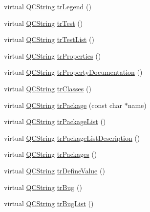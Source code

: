\begin{DoxyCompactItemize}
\item 
virtual \hyperlink{class_q_c_string}{Q\+C\+String} \hyperlink{class_translator_chinesetraditional_a7ec3338207371dd6b06edfe7a212d443}{tr\+Legend} ()
\item 
virtual \hyperlink{class_q_c_string}{Q\+C\+String} \hyperlink{class_translator_chinesetraditional_a986fde8083b58bef975adf8b94e40718}{tr\+Test} ()
\item 
virtual \hyperlink{class_q_c_string}{Q\+C\+String} \hyperlink{class_translator_chinesetraditional_a08c527aab589d7798710e841c0d79294}{tr\+Test\+List} ()
\item 
virtual \hyperlink{class_q_c_string}{Q\+C\+String} \hyperlink{class_translator_chinesetraditional_a12d4ce73f80d761d88d4f48502d1deb4}{tr\+Properties} ()
\item 
virtual \hyperlink{class_q_c_string}{Q\+C\+String} \hyperlink{class_translator_chinesetraditional_a957f249ec35e3e55307591caed7094a6}{tr\+Property\+Documentation} ()
\item 
virtual \hyperlink{class_q_c_string}{Q\+C\+String} \hyperlink{class_translator_chinesetraditional_a595c8dfa4f0a38cae32a616baae240f1}{tr\+Classes} ()
\item 
virtual \hyperlink{class_q_c_string}{Q\+C\+String} \hyperlink{class_translator_chinesetraditional_af245c5b503a9b765a2d2eb7ef2d793c1}{tr\+Package} (const char $\ast$name)
\item 
virtual \hyperlink{class_q_c_string}{Q\+C\+String} \hyperlink{class_translator_chinesetraditional_a0f012231cca065aadb4c58ed4615a1a3}{tr\+Package\+List} ()
\item 
virtual \hyperlink{class_q_c_string}{Q\+C\+String} \hyperlink{class_translator_chinesetraditional_ab4f562c3bfac8511ccd149ca98ef9415}{tr\+Package\+List\+Description} ()
\item 
virtual \hyperlink{class_q_c_string}{Q\+C\+String} \hyperlink{class_translator_chinesetraditional_ae1689433305f64baaa07a2995bad1216}{tr\+Packages} ()
\item 
virtual \hyperlink{class_q_c_string}{Q\+C\+String} \hyperlink{class_translator_chinesetraditional_a28a2c7f00f59d94cb514868bce7e02a1}{tr\+Define\+Value} ()
\item 
virtual \hyperlink{class_q_c_string}{Q\+C\+String} \hyperlink{class_translator_chinesetraditional_a5f09c2d99e71b0ecd441790b30c7f8fa}{tr\+Bug} ()
\item 
virtual \hyperlink{class_q_c_string}{Q\+C\+String} \hyperlink{class_translator_chinesetraditional_a25ced0a35ed54142173ffc5eec867b8d}{tr\+Bug\+List} ()

\end{DoxyCompactItemize}
